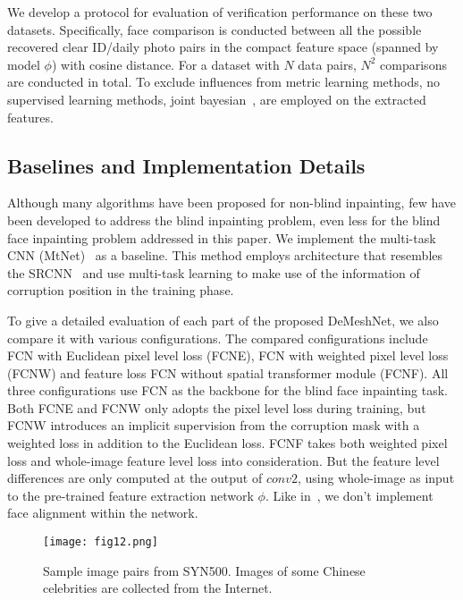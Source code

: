 \documentclass[10pt,twocolumn,letterpaper]{article}
\begin{document}
We develop a protocol for evaluation of verification performance on these two datasets. Specifically, face comparison is conducted between all the possible recovered clear ID/daily photo pairs in the compact feature space (spanned by model $\phi$) with cosine distance. For a dataset with $N$ data pairs, $N^2$ comparisons are conducted in total. To exclude influences from metric learning methods, no supervised learning methods, \eg joint bayesian~\cite{chen2012bayesian}, are employed on the extracted features.

\subsection{Baselines and Implementation Details}





Although many algorithms have been proposed for non-blind inpainting, few have been developed to address the blind inpainting problem, even less for the blind face inpainting problem addressed in this paper. We implement the multi-task CNN (MtNet)~\cite{7550058} as a baseline. This method employs architecture that resembles the SRCNN~\cite{dong2014learning} and use multi-task learning to make use of the information of corruption position in the training phase.

To give a detailed evaluation of each part of the proposed DeMeshNet, we also compare it with various configurations. The compared configurations include FCN with Euclidean pixel level loss (FCNE), FCN with weighted pixel level loss (FCNW) and feature loss FCN without spatial transformer module (FCNF). All three configurations use FCN as the backbone for the blind face inpainting task. Both FCNE and FCNW only adopts the pixel level loss during training, but FCNW introduces an implicit supervision from the corruption mask with a weighted loss in addition to the Euclidean loss. FCNF takes both weighted pixel loss and whole-image feature level loss into consideration. But the feature level differences are only computed at the output of $conv2$, using whole-image as input to the pre-trained feature extraction network $\phi$. Like in~\cite{johnson2016perceptual}, we don't implement face alignment within the network.
\begin{figure}
  \centering
    \texttt{[image: fig12.png]}
    \caption{Sample image pairs from SYN500. Images of some Chinese celebrities are collected from the Internet.}
    \label{fig:syn} %
\end{figure}
\end{document}
